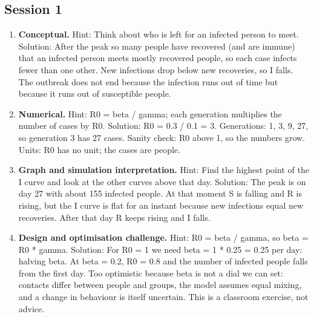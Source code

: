 \documentclass[11pt,a4paper]{article}
\begin{document}
\subsection*{Session 1}
\begin{enumerate}[nosep]
\item \textbf{Conceptual.} Hint: Think about who is left for an infected person to meet. Solution: After the peak so many people have recovered (and are immune) that an infected person meets mostly recovered people, so each case infects fewer than one other. New infections drop below new recoveries, so I falls. The outbreak does not end because the infection runs out of time but because it runs out of susceptible people.
\item \textbf{Numerical.} Hint: R0 = beta / gamma; each generation multiplies the number of cases by R0. Solution: R0 = 0.3 / 0.1 = 3. Generations: 1, 3, 9, 27, so generation 3 has 27 cases. Sanity check: R0 above 1, so the numbers grow. Units: R0 has no unit; the cases are people.
\item \textbf{Graph and simulation interpretation.} Hint: Find the highest point of the I curve and look at the other curves above that day. Solution: The peak is on day 27 with about 155 infected people. At that moment S is falling and R is rising, but the I curve is flat for an instant because new infections equal new recoveries. After that day R keeps rising and I falls.
\item \textbf{Design and optimisation challenge.} Hint: R0 = beta / gamma, so beta = R0 * gamma. Solution: For R0 = 1 we need beta = 1 * 0.25 = 0.25 per day: halving beta. At beta = 0.2, R0 = 0.8 and the number of infected people falls from the first day. Too optimistic because beta is not a dial we can set: contacts differ between people and groups, the model assumes equal mixing, and a change in behaviour is itself uncertain. This is a classroom exercise, not advice.
\end{enumerate}
\end{document}
